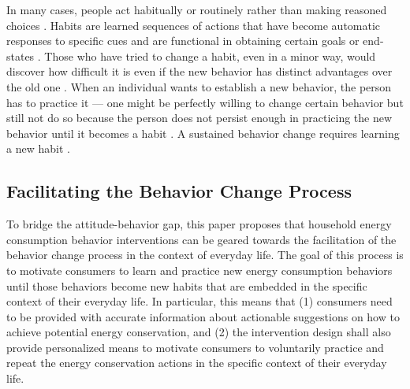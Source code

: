 \documentclass[a4paper]{article}
\begin{document}
In many cases, people act habitually or routinely rather than making reasoned choices \citep{Steg2009,Berthou2013}. Habits are learned sequences of actions that have become automatic responses to specific cues and are functional in obtaining certain goals or end-states \citep{Verplanken1999}. Those who have tried to change a habit, even in a minor way, would discover how difficult it is even if the new behavior has distinct advantages over the old one \citep{Kollmuss2002}. When an individual wants to establish a new behavior, the person has to practice it --- one might be perfectly willing to change certain behavior but still not do so because the person does not persist enough in practicing the new behavior until it becomes a habit \citep{Kollmuss2002}. A sustained behavior change requires learning a new habit \citep{Dillahunt:2009:GEU:1620545.1620583}. 


\subsection{Facilitating the Behavior Change Process}
\label{sec:bridgingGap:facilitatingProcess}

To bridge the attitude-behavior gap, this paper proposes that household energy consumption behavior interventions can be geared towards the facilitation of the behavior change process in the context of everyday life. The goal of this process is to motivate consumers to learn and practice new energy consumption behaviors until those behaviors become new habits that are embedded in the specific context of their everyday life. In particular, this means that (1) consumers need to be provided with accurate information about actionable suggestions on how to achieve potential energy conservation, and (2) the intervention design shall also provide personalized means to motivate consumers to voluntarily practice and repeat the energy conservation actions in the specific context of their everyday life.
\end{document}
